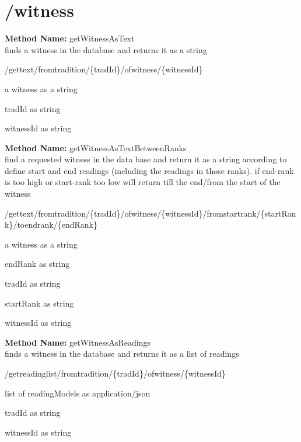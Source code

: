 \section{/witness}
\textbf{Method Name: }getWitnessAsText \\ finds a witness in the database and returns it as a string
\begin{get}
/gettext/fromtradition/\{tradId\}/ofwitness/\{witnessId\}
\end{get}
\begin{response}
a witness as a string
\end{response}
\begin{parameter}
tradId as string
\end{parameter}
\begin{parameter}
witnessId as string
\end{parameter}
\textbf{Method Name: }getWitnessAsTextBetweenRanks \\ find a requested witness in the data base and return it as a string according to define start and end readings (including the readings in those ranks). if end-rank is too high or start-rank too low will return till the end/from the start of the witness
\begin{get}
/gettext/fromtradition/\{tradId\}/ofwitness/\{witnessId\}/fromstartrank/\{startRank\}/toendrank/\{endRank\}
\end{get}
\begin{response}
a witness as a string
\end{response}
\begin{parameter}
endRank as string
\end{parameter}
\begin{parameter}
tradId as string
\end{parameter}
\begin{parameter}
startRank as string
\end{parameter}
\begin{parameter}
witnessId as string
\end{parameter}
\textbf{Method Name: }getWitnessAsReadings \\ finds a witness in the database and returns it as a list of readings
\begin{get}
/getreadinglist/fromtradition/\{tradId\}/ofwitness/\{witnessId\}
\end{get}
\begin{response}
list of readingModels as application/json
\end{response}
\begin{parameter}
tradId as string
\end{parameter}
\begin{parameter}
witnessId as string
\end{parameter}
